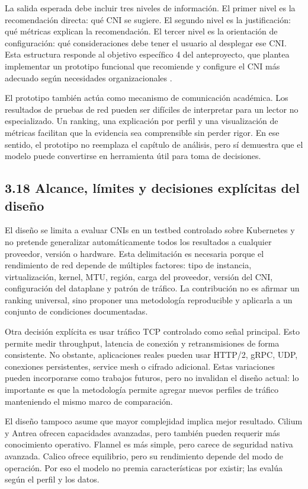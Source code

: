 \documentclass[journal]{IEEEtran}
\begin{document}
La salida esperada debe incluir tres niveles de información. El primer nivel es la recomendación directa: qué CNI se sugiere. El segundo nivel es la justificación: qué métricas explican la recomendación. El tercer nivel es la orientación de configuración: qué consideraciones debe tener el usuario al desplegar ese CNI. Esta estructura responde al objetivo específico 4 del anteproyecto, que plantea implementar un prototipo funcional que recomiende y configure el CNI más adecuado según necesidades organizacionales \cite{ref29}.

El prototipo también actúa como mecanismo de comunicación académica. Los resultados de pruebas de red pueden ser difíciles de interpretar para un lector no especializado. Un ranking, una explicación por perfil y una visualización de métricas facilitan que la evidencia sea comprensible sin perder rigor. En ese sentido, el prototipo no reemplaza el capítulo de análisis, pero sí demuestra que el modelo puede convertirse en herramienta útil para toma de decisiones.

\subsection{3.18 Alcance, límites y decisiones explícitas del diseño}

El diseño se limita a evaluar CNIs en un testbed controlado sobre Kubernetes y no pretende generalizar automáticamente todos los resultados a cualquier proveedor, versión o hardware. Esta delimitación es necesaria porque el rendimiento de red depende de múltiples factores: tipo de instancia, virtualización, kernel, MTU, región, carga del proveedor, versión del CNI, configuración del dataplane y patrón de tráfico. La contribución no es afirmar un ranking universal, sino proponer una metodología reproducible y aplicarla a un conjunto de condiciones documentadas.

Otra decisión explícita es usar tráfico TCP controlado como señal principal. Esto permite medir throughput, latencia de conexión y retransmisiones de forma consistente. No obstante, aplicaciones reales pueden usar HTTP/2, gRPC, UDP, conexiones persistentes, service mesh o cifrado adicional. Estas variaciones pueden incorporarse como trabajos futuros, pero no invalidan el diseño actual: lo importante es que la metodología permite agregar nuevos perfiles de tráfico manteniendo el mismo marco de comparación.

El diseño tampoco asume que mayor complejidad implica mejor resultado. Cilium y Antrea ofrecen capacidades avanzadas, pero también pueden requerir más conocimiento operativo. Flannel es más simple, pero carece de seguridad nativa avanzada. Calico ofrece equilibrio, pero su rendimiento depende del modo de operación. Por eso el modelo no premia características por existir; las evalúa según el perfil y los datos.
\end{document}
